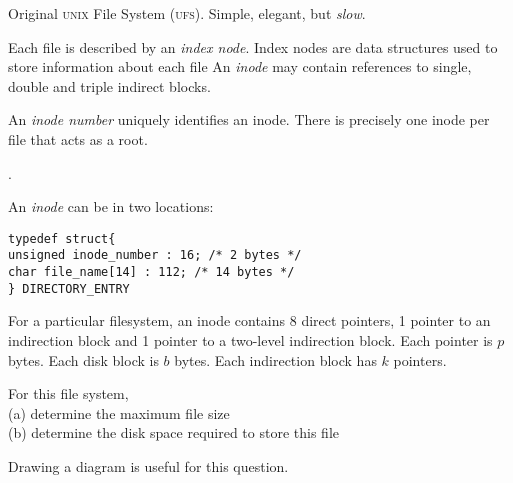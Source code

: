 Original \textsc{unix} File System (\textsc{ufs}).
Simple, elegant, but \textit{slow}.


Each file is described by an \textit{index node}.
Index nodes are data structures used to store information about each file
An \textit{inode} may contain references to single, double 
and triple indirect blocks.

An \textit{inode number} uniquely identiﬁes an inode.
There is precisely one inode per ﬁle that acts as a root.

.

An \textit{inode} can be in two locations:




\begin{lstlisting}
typedef struct{
unsigned inode_number : 16; /* 2 bytes */
char file_name[14] : 112; /* 14 bytes */
} DIRECTORY_ENTRY
\end{lstlisting}




\begin{example}
For a particular filesystem, an inode contains 8 direct pointers, 
1 pointer to an indirection block and 1 pointer to a 
two-level indirection block. 
Each pointer is $p$ bytes. Each disk block is $b$ bytes.
Each indirection block has $k$ pointers.

For this file system, \\
(a) determine the maximum file size \\
(b) determine the disk space required to store this file
\end{example}


Drawing a diagram is useful for this question. 

